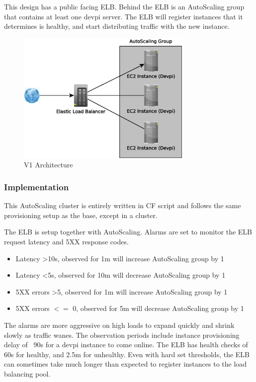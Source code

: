 \documentclass[12pt, letterpaper]{article}
\begin{document}
This design has a public facing ELB. Behind the ELB is an AutoScaling group that contains at least one devpi
server. The ELB will register instances that it determines is healthy, and start distributing traffic with the new instance.   

\begin{figure}[H]
    \caption{V1 Architecture}
    \centering
    \includegraphics[width=0.75\textwidth]{figures/v1_arch.eps}
\end{figure}

\subsubsection{Implementation}
This AutoScaling cluster is entirely written in CF script and follows the same provisioning setup as the base, except in a cluster.

The ELB is setup together with AutoScaling. Alarms are set to monitor the ELB request latency and 5XX response codes.

\begin{itemize}
    \item Latency \textgreater 10s, observed for 1m will increase AutoScaling group by 1
    \item Latency \textless 5s, observed for 10m will decrease AutoScaling group by 1
    \item 5XX errors \textgreater 5, observed for 1m will increase AutoScaling group by 1
    \item 5XX errors $<=$ 0, observed for 5m will decrease AutoScaling group by 1
\end{itemize}

The alarms are more aggressive on high loads to expand quickly and shrink slowly as traffic wanes. The observation periods
include instance provisioning delay of ~90s for a devpi instance to come online. The ELB has health checks of 60s for healthy, and
2.5m for unhealthy. Even with hard set thresholds, the ELB can sometimes take much longer than expected to register instances 
to the load balancing pool.
\end{document}
